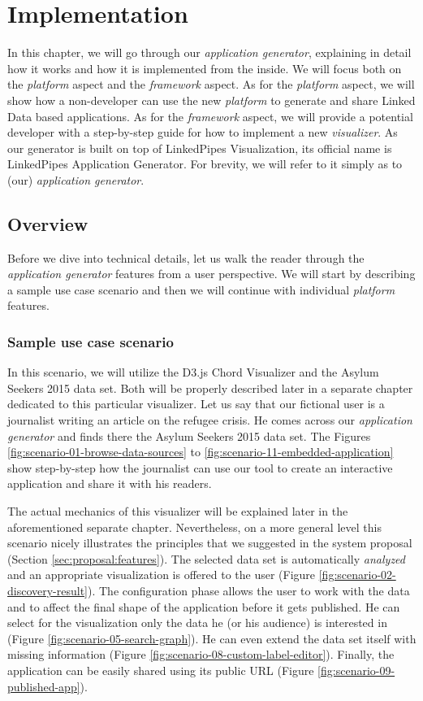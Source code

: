 \chapter{Implementation}

In this chapter, we will go through our \emph{application generator}, explaining in detail how it works and how it is implemented from the inside. We will focus both on the \emph{platform} aspect and the \emph{framework} aspect. As for the \emph{platform} aspect, we will show how a non-developer can use the new \emph{platform} to generate and share Linked Data based applications. As for the \emph{framework} aspect, we will provide a potential developer with a step-by-step guide for how to implement a new \emph{visualizer}. As our generator is built on top of LinkedPipes Visualization, its official name is LinkedPipes Application Generator. For brevity, we will refer to it simply as to (our) \emph{application generator}. 

\section{Overview}

Before we dive into technical details, let us walk the reader through the \emph{application generator} features from a user perspective. We will start by describing a sample use case scenario and then we will continue with individual \emph{platform} features.

\subsection{Sample use case scenario}

In this scenario, we will utilize the D3.js Chord Visualizer and the Asylum Seekers 2015 data set. Both will be properly described later in a separate chapter dedicated to this particular visualizer. Let us say that our fictional user is a journalist writing an article on the refugee crisis. He comes across our \emph{application generator} and finds there the Asylum Seekers 2015 data set. The Figures \ref{fig:scenario-01-browse-data-sources} to \ref{fig:scenario-11-embedded-application} show step-by-step how the journalist can use our tool to create an interactive application and share it with his readers.

The actual mechanics of this visualizer will be explained later in the aforementioned separate chapter. Nevertheless, on a more general level this scenario nicely illustrates the principles that we suggested in the system proposal (Section \ref{sec:proposal:features}). The selected data set is automatically \emph{analyzed} and an appropriate visualization is offered to the user (Figure \ref{fig:scenario-02-discovery-result}). The configuration phase allows the user to work with the data and to affect the final shape of the application before it gets published. He can select for the visualization only the data he (or his audience) is interested in (Figure \ref{fig:scenario-05-search-graph}). He can even extend the data set itself with missing information (Figure \ref{fig:scenario-08-custom-label-editor}). Finally, the application can be easily shared using its public URL (Figure \ref{fig:scenario-09-published-app}).

